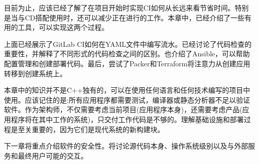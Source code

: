 目前为止，应该已经了解了在项目开始时实现CI如何从长远来看节省时间。特别是当与CD搭配使用时，还可以减少正在进行的工作。本章中，已经介绍了一些有用的工具，可以实现这两个过程。

上面已经展示了GitLab CI如何在YAML文件中编写流水。已经讨论了代码检查的重要性，并解释了不同形式的代码检查之间的区别。也介绍了Ansible，可以帮助配置管理和创建部署代码。最后，尝试了Packer和Terraform将注意力从创建应用转移到创建系统上。

本章中的知识并不是C++独有的，可以在使用任何语言和任何技术编写的项目中使用。应该记住的是:所有应用程序都需要测试，编译器或静态分析器不足以验证软件。作为架构师，不仅需要考虑当前项目(应用程序本身)，还需要考虑产品(应用程序将在其中工作的系统)，只交付工作代码是不够的。理解基础设施和部署过程是至关重要的，因为它们是现代系统的新构建块。

下一章将重点介绍软件的安全性。将讨论源代码本身、操作系统级别以及与外部服务和最终用户可能的交互。